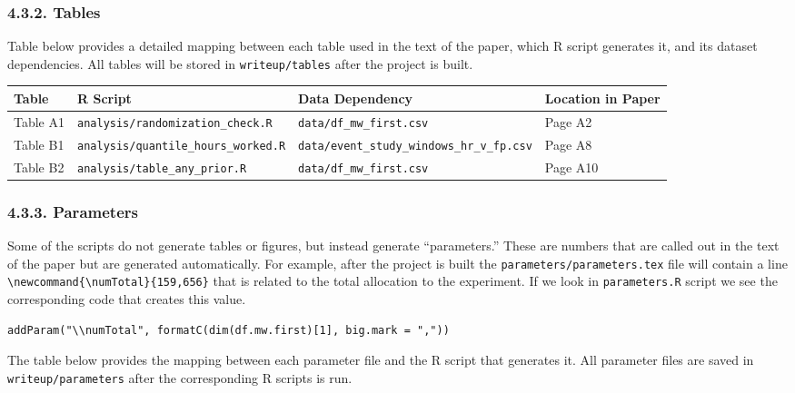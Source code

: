 \documentclass[10pt]{article}
\newenvironment{eightpt}{\begingroup\fontsize{8}{13}\selectfont}{\endgroup}
\begin{document}
\subsubsection*{4.3.2. Tables}

Table below provides a detailed mapping between each table used in the text of the paper, which R script generates it, and its dataset dependencies. 
All tables will be stored in \texttt{writeup/tables} after the project is built.

\begin{eightpt}
\begin{tabularx}{\textwidth}{@{}p{}p{}p{}>{\centering\arraybackslash}p{}@{}}
\toprule
Table & R Script & Data Dependency & Location in Paper \\
\midrule
Table A1 & \texttt{analysis/randomization\_check.R} & \texttt{data/df\_mw\_first.csv} & Page A2 \\
Table B1 & \texttt{analysis/quantile\_hours\_worked.R} & \texttt{data/event\_study\_windows\_hr\_v\_fp.csv} & Page A8 \\
Table B2 & \texttt{analysis/table\_any\_prior.R} & \texttt{data/df\_mw\_first.csv} & Page A10 \\
\bottomrule
\end{tabularx}
\end{eightpt}

\subsubsection*{4.3.3. Parameters}

Some of the scripts do not generate tables or figures, but instead generate ``parameters.''
These are numbers that are called out in the text of the paper but are generated automatically. 
For example, after the project is built the \texttt{parameters/parameters.tex} file will contain a line 
\verb|\newcommand{\numTotal}{159,656}| that is related to the total allocation to the experiment.
If we look in \texttt{parameters.R} script we see the corresponding code that creates this value.

\begin{verbatim}
addParam("\\numTotal", formatC(dim(df.mw.first)[1], big.mark = ","))
\end{verbatim}

The table below provides the mapping between each parameter file and the R script that generates it. 
All parameter files are saved in \texttt{writeup/parameters} after the corresponding R scripts is run.
\end{document}
